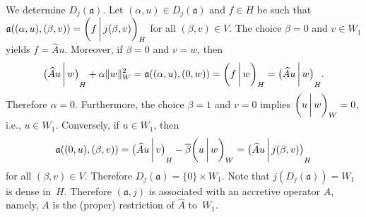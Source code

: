 \documentclass[a4paper,oneside,12pt]{amsart}
\theoremstyle{plain}
\theoremstyle{definition}
\newenvironment{example}
{\pushQED{\qed}

\examplex}
{\popQED\endexamplex}
\DeclarePairedDelimiter\norm{\lVert}{\rVert}
\begin{document}
\begin{example}
We determine $D_j({{\mathfrak{{a}}}})$. Let $(\alpha,u)\in D_j({{\mathfrak{{a}}}})$ and $f\in H$ be such that 
${{\mathfrak{{a}}}}((\alpha,u),(\beta,v)) = {{\ifthenelse{\equal{auto}{auto}}{\left({f}\mkern3mu{\biggm|}\mkern3mu {j(\beta,v)}\right)}{}
\ifthenelse{\equal{auto}{b}}{\bigl({f}\mkern3mu{\biggm|}\mkern3mu {j(\beta,v)}\bigr)}{}
\ifthenelse{\equal{auto}{B}}{\Bigl({f}\mkern3mu{\bigm|}\mkern3mu {j(\beta,v)}\Bigr)}{}
}}_H$ for all $(\beta,v)\in V$.
The choice $\beta=0$ and $v\in W_1$ yields $f=\widehat{A} u$.
Moreover, if $\beta=0$ and $v=w$, then
\[
    {{\ifthenelse{\equal{b}{auto}}{\left({\widehat{A} u}\mkern3mu{\biggm|}\mkern3mu {w}\right)}{}
\ifthenelse{\equal{b}{b}}{\bigl({\widehat{A} u}\mkern3mu{\biggm|}\mkern3mu {w}\bigr)}{}
\ifthenelse{\equal{b}{B}}{\Bigl({\widehat{A} u}\mkern3mu{\bigm|}\mkern3mu {w}\Bigr)}{}
}}_H + \alpha\norm{w}_W^2 = {{\mathfrak{{a}}}}((\alpha,u),(0,w)) = {{\ifthenelse{\equal{auto}{auto}}{\left({f}\mkern3mu{\biggm|}\mkern3mu {w}\right)}{}
\ifthenelse{\equal{auto}{b}}{\bigl({f}\mkern3mu{\biggm|}\mkern3mu {w}\bigr)}{}
\ifthenelse{\equal{auto}{B}}{\Bigl({f}\mkern3mu{\bigm|}\mkern3mu {w}\Bigr)}{}
}}_H = {{\ifthenelse{\equal{b}{auto}}{\left({\widehat{A} u}\mkern3mu{\biggm|}\mkern3mu {w}\right)}{}
\ifthenelse{\equal{b}{b}}{\bigl({\widehat{A} u}\mkern3mu{\biggm|}\mkern3mu {w}\bigr)}{}
\ifthenelse{\equal{b}{B}}{\Bigl({\widehat{A} u}\mkern3mu{\bigm|}\mkern3mu {w}\Bigr)}{}
}}_H.
\]
Therefore $\alpha=0$. Furthermore, the choice $\beta=1$ and $v=0$ implies ${{\ifthenelse{\equal{auto}{auto}}{\left({u}\mkern3mu{\biggm|}\mkern3mu {w}\right)}{}
\ifthenelse{\equal{auto}{b}}{\bigl({u}\mkern3mu{\biggm|}\mkern3mu {w}\bigr)}{}
\ifthenelse{\equal{auto}{B}}{\Bigl({u}\mkern3mu{\bigm|}\mkern3mu {w}\Bigr)}{}
}}_W=0$, i.e., $u\in W_1$.
Conversely, if $u\in W_1$, then
\[
    {{\mathfrak{{a}}}}((0,u),(\beta,v)) = {{\ifthenelse{\equal{b}{auto}}{\left({\widehat{A} u}\mkern3mu{\biggm|}\mkern3mu {v}\right)}{}
\ifthenelse{\equal{b}{b}}{\bigl({\widehat{A} u}\mkern3mu{\biggm|}\mkern3mu {v}\bigr)}{}
\ifthenelse{\equal{b}{B}}{\Bigl({\widehat{A} u}\mkern3mu{\bigm|}\mkern3mu {v}\Bigr)}{}
}}_H - {\overline{{\beta}}}{{\ifthenelse{\equal{auto}{auto}}{\left({u}\mkern3mu{\biggm|}\mkern3mu {w}\right)}{}
\ifthenelse{\equal{auto}{b}}{\bigl({u}\mkern3mu{\biggm|}\mkern3mu {w}\bigr)}{}
\ifthenelse{\equal{auto}{B}}{\Bigl({u}\mkern3mu{\bigm|}\mkern3mu {w}\Bigr)}{}
}}_W = {{\ifthenelse{\equal{b}{auto}}{\left({\widehat{A} u}\mkern3mu{\biggm|}\mkern3mu {j(\beta,v)}\right)}{}
\ifthenelse{\equal{b}{b}}{\bigl({\widehat{A} u}\mkern3mu{\biggm|}\mkern3mu {j(\beta,v)}\bigr)}{}
\ifthenelse{\equal{b}{B}}{\Bigl({\widehat{A} u}\mkern3mu{\bigm|}\mkern3mu {j(\beta,v)}\Bigr)}{}
}}_H
\]
for all $(\beta,v)\in V$. Therefore $D_j({{\mathfrak{{a}}}})=\{0\}\times W_1$. Note that $j(D_j({{\mathfrak{{a}}}}))=W_1$ is dense in~$H$.
Therefore $({{\mathfrak{{a}}}},j)$ is associated with an accretive operator $A$,
namely, $A$ is the (proper) restriction of $\widehat{A}$ to~$W_1$.


\end{example}
\end{document}
